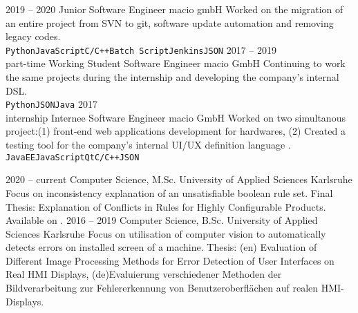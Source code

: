 \documentclass[8pt]{developercv} %
\newcommand{\linebreaksmall}{\vspace{2mm}}
\begin{document}
\begin{entrylist}
	\entry
		{2019 -- 2020}
		{Junior Software Engineer}
		{macio gmbH}
		{Worked on the migration of an entire project from SVN to git, software update automation and removing legacy codes.
		\linebreaksmall \\ \texttt{Python}\slashsep\texttt{JavaScript}\slashsep\texttt{C/C++}\slashsep\texttt{Batch Script}\slashsep\texttt{Jenkins}\slashsep\texttt{JSON}} \linebreaksmall
	\entry
		{2017 -- 2019 \\\footnotesize{part-time}}
		{Working Student Software Engineer}
		{macio GmbH}
		{Continuing to work the same projects during the internship and developing the company's internal DSL.
		\linebreaksmall \\ \texttt{Python}\slashsep\texttt{JSON}\slashsep\texttt{Java}} \linebreaksmall
	\entry
		{2017 \\\footnotesize{internship}}
		{Internee Software Engineer}
		{macio GmbH}
		{Worked on two simultanous project:(1) front-end web applications development for hardwares, (2) Created a testing tool for the company's internal UI/UX definition language . 
		\linebreaksmall \\ \texttt{JavaEE}\slashsep\texttt{JavaScript}\slashsep\texttt{Qt}\slashsep\texttt{C/C++}\slashsep\texttt{JSON}}
\end{entrylist}



\begin{entrylist}
	\entry
		{2020 -- current}
		{Computer Science, M.Sc.}
		{University of Applied Sciences Karlsruhe}
		{Focus on inconsistency explanation of an unsatisfiable boolean rule set. Final Thesis: Explanation of Conflicts in Rules for Highly Configurable Products. Available on .}
	\entry
		{2016 -- 2019}
		{Computer Science, B.Sc.}
		{University of Applied Sciences Karlsruhe}
		{Focus on utilisation of computer vision to automatically detects errors on installed screen of a machine. Thesis: (en) Evaluation of Different Image Processing Methods for Error Detection of User Interfaces on Real HMI Displays,
        (de)Evaluierung verschiedener Methoden der Bildverarbeitung zur Fehlererkennung von Benutzeroberflächen auf realen HMI-Displays.}
\end{entrylist}
\end{document}
